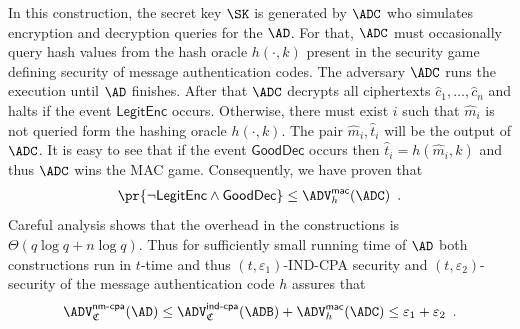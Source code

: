 \documentclass{crypto-exercise}
\newcommand{\ADVNMCPA}[2]{\ADV^{\mathsf{nm\text{-}cpa}}_{#1}{(#2)}}
\newcommand{\ADVMAC}[2]{\ADV^{\mathsf{mac}}_{#1}{(#2)}}
\newcommand{\CS}{\mathfrak{C}}
\newcommand{\LENC}{\mathsf{LegitEnc}}
\newcommand{\GDEC}{\mathsf{GoodDec}}
\begin{document}
\begin{solution}
In this construction, the secret key $\SK$ is generated by $\ADC$ who simulates encryption and decryption queries for the $\AD$. For that, $\ADC$ must occasionally query hash values from the hash oracle $h(\cdot,k)$ present in the security game defining security of message authentication codes. The adversary $\ADC$ runs the execution until $\AD$ finishes. After that $\ADC$ decrypts all ciphertexts $\hat{c}_1,\ldots,\hat{c}_n$ and halts if the event $\LENC$ occurs. Otherwise, there must exist $i$ such that $\hat{m}_i$ is not queried form the hashing oracle $h(\cdot,k)$. The pair $\hat{m}_i,\hat{t}_i$ will be the output of $\ADC$. It is easy to see that if the event $\GDEC$ occurs then $\hat{t}_i=h(\hat{m}_i,k)$ and thus $\ADC$ wins the MAC game. Consequently, we have proven that 
\begin{align*}
\pr{\neg\LENC\wedge\GDEC} \leq \ADVMAC{h}{\ADC}\enspace.
\end{align*}   
Careful analysis shows that the overhead in the constructions is $\Theta(q\log q +n\log q)$. Thus for sufficiently small running time of $\AD$ both constructions run in $t$-time and thus $(t,\varepsilon_1)$-IND-CPA security and $(t,\varepsilon_2)$-security of the message authentication code $h$ assures that 
\begin{align*}
\ADVNMCPA{\CS}{\AD}\leq \ADVINDCPA{\CS}{\ADB} + \ADVMAC{h}{\ADC}\leq \varepsilon_1+\varepsilon_2\enspace.
\end{align*}
\end{solution}
\end{document}
